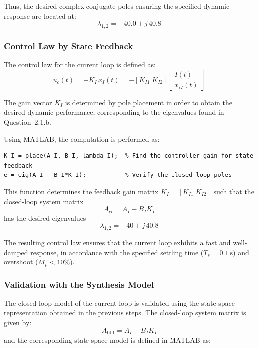 \documentclass{rapportCS}
\begin{document}
Thus, the desired complex conjugate poles ensuring the specified dynamic response are located at:
\[
\boxed{\lambda_{1,2} = -40.0 \pm j\,40.8}
\]


\subsubsection{Control Law by State Feedback}

The control law for the current loop is defined as:
\begin{equation*}
u_c(t) = -K_I\,x_I(t) = -[K_{I1}\; K_{I2}]
\begin{bmatrix}
I(t) \\[4pt]
x_{\varepsilon I}(t)
\end{bmatrix}
\end{equation*}

The gain vector $K_I$ is determined by pole placement in order to obtain the desired dynamic performance, corresponding to the eigenvalues found in Question~2.1.b.

Using MATLAB, the computation is performed as:
\begin{verbatim}
K_I = place(A_I, B_I, lambda_I);  % Find the controller gain for state feedback
e = eig(A_I - B_I*K_I);           % Verify the closed-loop poles
\end{verbatim}

This function determines the feedback gain matrix $K_I = [K_{I1}\; K_{I2}]$ such that the closed-loop system matrix
\begin{equation*}
A_{cl} = A_I - B_I K_I
\end{equation*}
has the desired eigenvalues
\begin{equation*}
\lambda_{1,2} = -40 \pm j\,40.8
\end{equation*}

The resulting control law ensures that the current loop exhibits a fast and well-damped response, in accordance with the specified settling time ($T_s = 0.1~\mathrm{s}$) and overshoot ($M_p < 10\%$).
\subsubsection{Validation with the Synthesis Model}

The closed-loop model of the current loop is validated using the state-space representation obtained in the previous steps.  
The closed-loop system matrix is given by:
\[
A_{\mathrm{bf\_I}} = A_I - B_I K_I
\]
and the corresponding state-space model is defined in MATLAB as:
\end{document}
